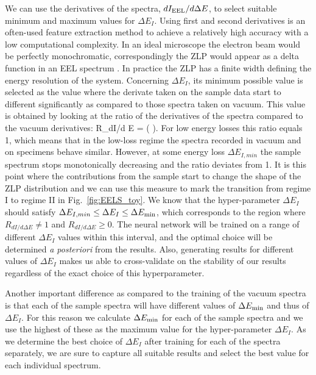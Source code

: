 We can use the derivatives of the spectra, $dI_{\rm EEL}/d\Delta E$, to select suitable minimum and
maximum values for $\Delta E_I$. 
%
Using first and second derivatives is an often-used feature extraction method to achieve a relatively 
high accuracy with a low computational complexity. 
%
In an ideal microscope the electron beam would be perfectly monochromatic, 
correspondingly the ZLP would appear as a delta function in an EEL spectrum \cite{Rafferty:2000}. 
%
In practice the ZLP has a finite width defining the energy resolution of the system. 
%
Concerning $\Delta E_I $, its minimum possible value is selected as the value where the derivate taken on the sample
data start to different significantly as compared to those spectra taken on vacuum.
%
This value is obtained by looking at the ratio of the derivatives of the spectra compared to the vacuum derivatives:
\be
R_{dI/d \Delta E} =  \left( \right). 
\ee
%
For low energy losses this ratio equals 1, which means that in the low-loss regime
the spectra recorded in vacuum and on specimens behave similar.
%
However, at some energy loss $\Delta E_{I,min}$ the
sample spectrum stops monotonically decreasing and the ratio deviates from 1. 
%
It is this point where the contributions from the sample start to change the shape of
the ZLP distribution and we can use this measure to mark the transition from 
regime I to regime II in Fig.~\ref{fig:EELS_toy}.
%
We know that the hyper-parameter $\Delta E_I$ should satisfy 
$\Delta E_{I,min} \le \Delta E_I \le \Delta E_{\rm min}$,
which corresponds to the region where $R_{dI/d \Delta E} \ne  1$ and $R_{dI/d \Delta E} \ge 0$.
%
The neural network will be trained on a range of different $\Delta E_I$ values within this interval,
and the optimal choice will be determined {\it a posteriori} from the results.
%
Also, generating results for different values of $\Delta E_I$ makes us able to 
cross-validate on the stability of our results regardless of the exact choice of this
hyperparameter.

Another important difference as compared to the training of the vacuum spectra is that each of the sample
spectra will have different values of $\Delta E_{\rm min}$ and thus of $\Delta E_I$. 
%
For this reason we calculate $\Delta E_{\rm min}$  for each of the sample spectra and we use the highest of these
as the maximum value for the hyper-parameter $\Delta E_I$. 
%
As we determine the best choice of $\Delta E_I$ after training for each of the spectra separately, 
we are sure to capture all suitable results and select the best value for each individual spectrum. \\

